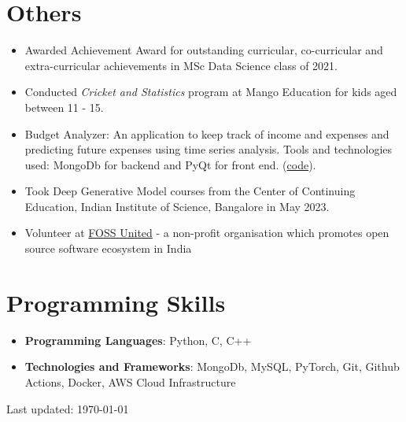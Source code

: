 \documentclass[letterpaper,11pt]{article}
\newcommand{\resumeItemSimple}[1]{
  \item\small{
    {#1 \vspace{-2pt}}
  }
}
\newcommand{\resumeSubItemSimple}[1]{\resumeItemSimple{#1}\vspace{-4pt}}
\newcommand{\resumeSubHeadingListStart}{\begin{itemize}[leftmargin=*]}
\newcommand{\resumeSubHeadingListEnd}{\end{itemize}}
\begin{document}
\section{Others}
  \resumeSubHeadingListStart
    \resumeSubItemSimple {Awarded Achievement Award for outstanding curricular, co-curricular and extra-curricular achievements in MSc Data Science class of 2021.}
    \resumeSubItemSimple {Conducted \textit{Cricket and Statistics} program at Mango Education for kids aged between 11 - 15.}
    \resumeSubItemSimple {Budget Analyzer: An application to keep track of income and expenses and predicting future expenses using time series analysis. Tools and technologies used: MongoDb for backend and PyQt for front end. (\href{https://github.com/arunppsg/budget-analyzer}{code}).}
    \resumeSubItemSimple {Took Deep Generative Model courses from the Center of Continuing Education, Indian Institute of Science, Bangalore in May 2023.}
    \resumeSubItemSimple {Volunteer at \href{https://fossunited.org/}{FOSS United} - a non-profit organisation which promotes open source software ecosystem in India}

  \resumeSubHeadingListEnd
%
\section{Programming Skills}
  \resumeSubHeadingListStart
    \resumeSubItemSimple{\textbf{Programming Languages}{: Python, C, C++}}
    \resumeSubItemSimple{\textbf{Technologies and Frameworks}{: MongoDb, MySQL, PyTorch, Git, Github Actions, Docker, AWS Cloud Infrastructure}}
  \resumeSubHeadingListEnd


\begin{footnotesize}
  Last updated: \today
\end{footnotesize}
\end{document}

